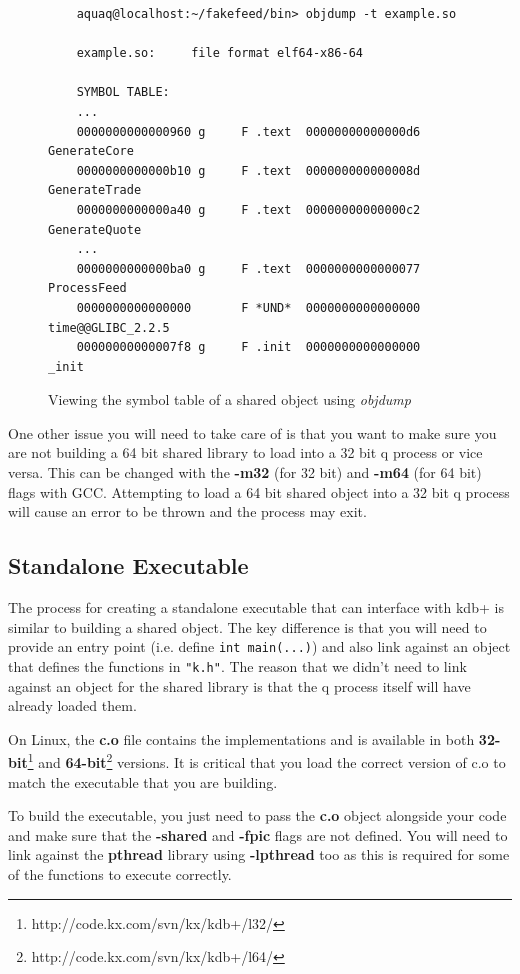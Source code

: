 \begin{figure}[h]
	\begin{lstlisting}
	aquaq@localhost:~/fakefeed/bin> objdump -t example.so
	
	example.so:     file format elf64-x86-64
	
	SYMBOL TABLE:
	...
	0000000000000960 g     F .text	00000000000000d6              GenerateCore
	0000000000000b10 g     F .text	000000000000008d              GenerateTrade
	0000000000000a40 g     F .text	00000000000000c2              GenerateQuote
	...
	0000000000000ba0 g     F .text	0000000000000077              ProcessFeed
	0000000000000000       F *UND*	0000000000000000              time@@GLIBC_2.2.5
	00000000000007f8 g     F .init	0000000000000000              _init
	\end{lstlisting}
	\caption{Viewing the symbol table of a shared object using \textit{objdump}}
\end{figure}

One other issue you will need to take care of is that you want to make sure you are not building a 64 bit
shared library to load into a 32 bit q process or vice versa. This can be changed with the \textbf{-m32} (for 32 bit) and \textbf{-m64} (for 64 bit) flags with GCC. Attempting to load a 64 bit shared object into a 32 bit
q process will cause an error to be thrown and the process may exit. 

\subsection{Standalone Executable}

The process for creating a standalone executable that can interface with kdb+ is similar to building a shared
object. The key difference is that you will need to provide an entry point (i.e. define \verb|int main(...)|)
and also link against an object that defines the functions in \verb|"k.h"|. The reason that we didn't need to
link against an object for the shared library is that the q process itself will have already loaded them.

On Linux, the \textbf{c.o} file contains the implementations and is available in both \textbf{32-bit}\footnote{http://code.kx.com/svn/kx/kdb+/l32/} and \textbf{64-bit}\footnote{http://code.kx.com/svn/kx/kdb+/l64/} versions. It is critical that you load the correct
version of c.o to match the executable that you are building.

To build the executable, you just need to pass the \textbf{c.o} object alongside your code and make sure that
the \textbf{-shared} and \textbf{-fpic} flags are not defined. You will need
to link against the \textbf{pthread} library using \textbf{-lpthread} too as this is required for some of the
functions to execute correctly.

